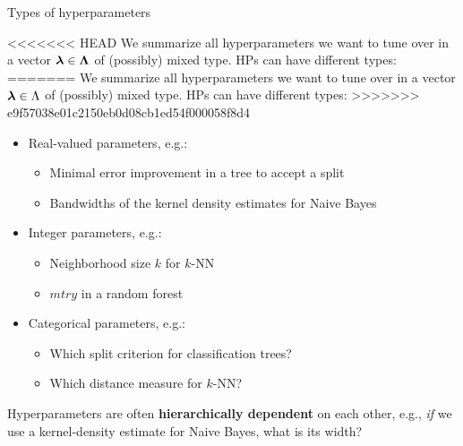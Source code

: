 \documentclass[11pt,compress,t,notes=noshow, xcolor=table]{beamer}
\begin{document}
\begin{vbframe}{Types of hyperparameters}

<<<<<<< HEAD
We summarize all hyperparameters we want to tune over in a vector $\bm{\lambda} \in \bm{\Lambda}$ of (possibly) mixed type. HPs can have different types: 
=======
We summarize all hyperparameters we want to tune over in a vector $\bm{\lambda} \in \Lambda$ of (possibly) mixed type. HPs can have different types: 
>>>>>>> e9f57038e01c2150eb0d08cb1ed54f000058f8d4

\begin{itemize}
\item Real-valued parameters, e.g.:
\begin{itemize}
\item Minimal error improvement in a tree to accept a split
\item Bandwidths of the kernel density estimates for Naive Bayes 
\end{itemize}
\item Integer parameters, e.g.:
\begin{itemize}
\item Neighborhood size $k$ for $k$-NN
\item $mtry$ in a random forest
\end{itemize}
\item Categorical parameters, e.g.:
\begin{itemize}
\item Which split criterion for classification trees?
\item Which distance measure for $k$-NN?
\end{itemize}
\end{itemize}

Hyperparameters are often \textbf{hierarchically dependent} on each other, e.g., \emph{if} we use 
a kernel-density estimate for Naive Bayes, what is its width? 
\end{vbframe}


\endlecture
\end{document}
